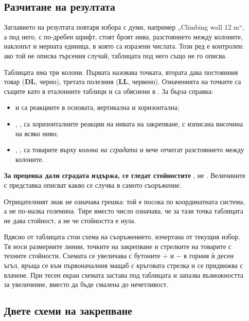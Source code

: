 \subsection{Разчитане на резултата}
\label{subsec:ug-read}

Заглавието на резултата повтаря избора с думи, например „Climbing wall 12 m“, а под
него, с по-дребен шрифт, стоят броят нива, разстоянието между колоните, наклонът и
мерната единица, в която са изразени числата. Този ред е контролен: ако той не описва
търсения случай, таблицата под него също не го описва.

Таблицата има три колони. Първата назовава точката, втората дава постоянния товар
(\textbf{DL}, черно), третата полезния (\textbf{LL}, червено). Означенията на точките
са същите като в еталонните таблици и са обяснени в . За бърза
справка:

\begin{itemize}[topsep=2pt,itemsep=1pt,leftmargin=*]
\item {} и  са реакциите в основата, вертикална и хоризонтална;
\item {}, ,  са хоризонталните реакции на нивата на
      закрепване, с изписана височина на всяко ниво;
\item {}, ,  са товарите върху \emph{колона на сградата} и
      вече отчитат разстоянието между колоните.
\end{itemize}

\textbf{За преценка дали сградата издържа, се гледат стойностите }, не
. Величините с представка  описват какво се случва в самото
съоръжение.

Отрицателният знак не означава грешка: той е посока по координатната система, а не
по-малка големина. Тире вместо число означава, че за тази точка таблицата не дава
стойност, а не че стойността е нула.

Вдясно от таблицата стои схема на съоръжението, изчертана от текущия избор. Тя носи
размерните линии, точките на закрепване и стрелките на товарите с техните стойности.
Схемата се увеличава с бутоните $+$ и $-$ в горния ѝ десен ъгъл, връща се към
първоначалния мащаб с кръговата стрелка и се придвижва с влачене. При тесен екран
схемата застава под таблицата и запазва възможността за увеличение, вместо да бъде
смалена до нечетливост.

\subsection{Двете схеми на закрепване}
\label{subsec:ug-options}

